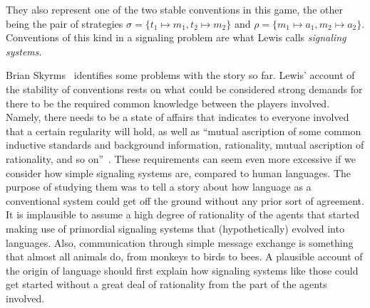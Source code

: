 \documentclass[a4paper]{article}
\begin{document}
They also represent one of the two stable conventions in this game, the other being the pair of strategies $\sigma = \lbrace t_1 \mapsto m_1, t_2 \mapsto m_2 \rbrace$ and $\rho = \lbrace m_1 \mapsto a_1, m_2 \mapsto a_2 \rbrace$.
Conventions of this kind in a signaling problem are what Lewis calls \emph{signaling systems}.

Brian Skyrms~\parencite*[80--104]{skyrms_evolution_1996} identifies some problems with the story so far.
Lewis' account of the stability of conventions rests on what could be considered strong demands for there to be the required common knowledge between the players involved.
Namely, there needs to be a state of affairs that indicates to everyone involved that a certain regularity will hold, as well as ``mutual ascription of some common inductive standards and background information, rationality, mutual ascription of rationality, and so on''~\parencite*[56--57]{lewis_convention_1969}.
These requirements can seem even more excessive if we consider how simple signaling systems are, compared to human languages.
The purpose of studying them was to tell a story about how language as a conventional system could get off the ground without any prior sort of agreement.
It is implausible to assume a high degree of rationality of the agents that started making use of primordial signaling systems that (hypothetically) evolved into languages.
Also, communication through simple message exchange is something that almost all animals do, from monkeys to birds to bees.
A plausible account of the origin of language should first explain how signaling systems like those could get started without a great deal of rationality from the part of the agents involved.
\end{document}
